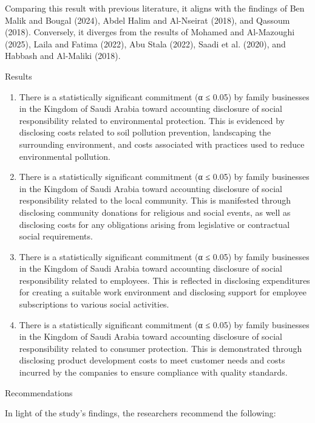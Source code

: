 \documentclass[10pt]{NSP1}
\begin{document}
Comparing this result with previous literature, it aligns with the findings of Ben Malik and Bougal (2024), Abdel Halim and Al-Nseirat (2018), and Qassoum (2018). Conversely, it diverges from the results of Mohamed and Al-Mazoughi (2025), Laila and Fatima (2022), Abu Stala (2022), Saadi et al. (2020), and Habbash and Al-Maliki (2018).

Results

\begin{enumerate}
  \item There is a statistically significant commitment (α ≤ 0.05) by family businesses in the Kingdom of Saudi Arabia toward accounting disclosure of social responsibility related to environmental protection. This is evidenced by disclosing costs related to soil pollution prevention, landscaping the surrounding environment, and costs associated with practices used to reduce environmental pollution.
  \item There is a statistically significant commitment (α ≤ 0.05) by family businesses in the Kingdom of Saudi Arabia toward accounting disclosure of social responsibility related to the local community. This is manifested through disclosing community donations for religious and social events, as well as disclosing costs for any obligations arising from legislative or contractual social requirements.
  \item There is a statistically significant commitment (α ≤ 0.05) by family businesses in the Kingdom of Saudi Arabia toward accounting disclosure of social responsibility related to employees. This is reflected in disclosing expenditures for creating a suitable work environment and disclosing support for employee subscriptions to various social activities.
  \item There is a statistically significant commitment (α ≤ 0.05) by family businesses in the Kingdom of Saudi Arabia toward accounting disclosure of social responsibility related to consumer protection. This is demonstrated through disclosing product development costs to meet customer needs and costs incurred by the companies to ensure compliance with quality standards.
\end{enumerate}

Recommendations

In light of the study’s findings, the researchers recommend the following:
\end{document}
